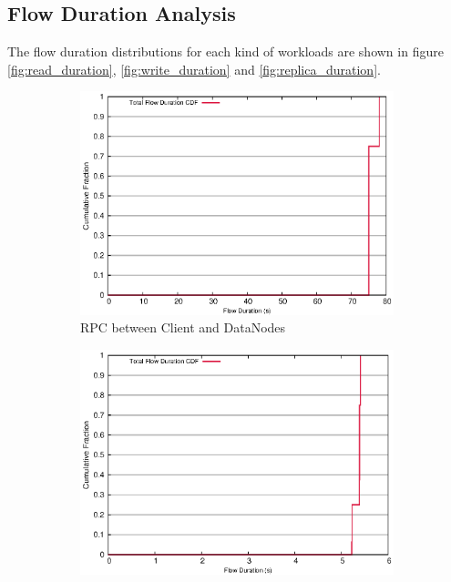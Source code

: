 \subsection{\bf Flow Duration Analysis}
The flow duration distributions for each kind of workloads are shown in figure \ref{fig:read_duration}, \ref{fig:write_duration} and \ref{fig:replica_duration}.

\begin{figure}[!htpb]
\centering
  \begin{subfigure}[b]{.45\linewidth}
   \centering
	\includegraphics[width=.99\textwidth]{figures/4read/24_28_type_duration.eps} 
	\caption{RPC between Client and DataNodes}\label{fig:read_duration:rpc}
   \end{subfigure}%
  \begin{subfigure}[b]{.45\linewidth}
   \centering
	\includegraphics[width=.99\textwidth]{figures/4read/24_28_20_16_type_duration.eps} 

\end{subfigure}
\end{figure}
